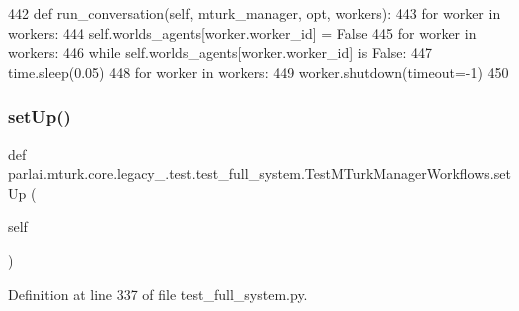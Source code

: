 \begin{DoxyCode}
442     \textcolor{keyword}{def }run\_conversation(self, mturk\_manager, opt, workers):
443         \textcolor{keywordflow}{for} worker \textcolor{keywordflow}{in} workers:
444             self.worlds\_agents[worker.worker\_id] = \textcolor{keyword}{False}
445         \textcolor{keywordflow}{for} worker \textcolor{keywordflow}{in} workers:
446             \textcolor{keywordflow}{while} self.worlds\_agents[worker.worker\_id] \textcolor{keywordflow}{is} \textcolor{keyword}{False}:
447                 time.sleep(0.05)
448         \textcolor{keywordflow}{for} worker \textcolor{keywordflow}{in} workers:
449             worker.shutdown(timeout=-1)
450 
\end{DoxyCode}
\mbox{\label{classparlai_1_1mturk_1_1core_1_1legacy__2018_1_1test_1_1test__full__system_1_1TestMTurkManagerWorkflows_ab361c63be767de8fd43419409a0b5b6e}} 
\subsubsection{\texorpdfstring{set\+Up()}{setUp()}}
{\footnotesize\ttfamily def parlai.\+mturk.\+core.\+legacy\+\_.\+test.\+test\+\_\+full\+\_\+system.\+Test\+M\+Turk\+Manager\+Workflows.\+set\+Up (\begin{DoxyParamCaption}\item[{}]{self }\end{DoxyParamCaption})}



Definition at line 337 of file test\+\_\+full\+\_\+system.\+py.


